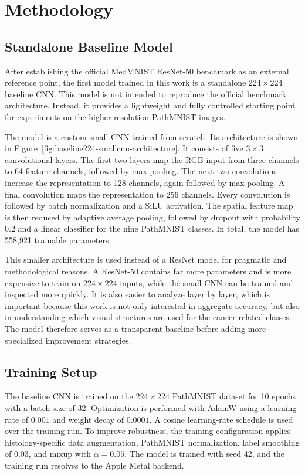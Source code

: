 \section{Methodology}

\subsection{Standalone Baseline Model}
After establishing the official MedMNIST ResNet-50 benchmark as an external
reference point, the first model trained in this work is a standalone
$224 \times 224$ baseline CNN. This model is not intended to reproduce the
official benchmark architecture. Instead, it provides a lightweight and fully
controlled starting point for experiments on the higher-resolution PathMNIST
images.

The model is a custom small CNN trained from scratch. Its architecture is shown
in Figure~\ref{fig:baseline224-smallcnn-architecture}. It consists of five
$3 \times 3$ convolutional layers. The first two layers map the RGB input from
three channels to 64 feature channels, followed by max pooling. The next two
convolutions increase the representation to 128 channels, again followed by max
pooling. A final convolution maps the representation to 256 channels. Every
convolution is followed by batch normalization and a SiLU activation. The spatial
feature map is then reduced by adaptive average pooling, followed by dropout with
probability $0.2$ and a linear classifier for the nine PathMNIST classes. In
total, the model has 558,921 trainable parameters.



This smaller architecture is used instead of a ResNet model for pragmatic and
methodological reasons. A ResNet-50 contains far more parameters and is more
expensive to train on $224 \times 224$ inputs, while the small CNN can be trained
and inspected more quickly. It is also easier to analyze layer by layer, which is
important because this work is not only interested in aggregate accuracy, but
also in understanding which visual structures are used for the cancer-related
classes. The model therefore serves as a transparent baseline before adding more
specialized improvement strategies.

\subsection{Training Setup}
The baseline CNN is trained on the $224 \times 224$ PathMNIST dataset for 10
epochs with a batch size of 32. Optimization is performed with AdamW using a
learning rate of $0.001$ and weight decay of $0.0001$. A cosine learning-rate
schedule is used over the training run. To improve robustness, the training
configuration applies histology-specific data augmentation, PathMNIST
normalization, label smoothing of $0.03$, and mixup with $\alpha = 0.05$. The
model is trained with seed 42, and the training run resolves to the Apple
Metal backend.

